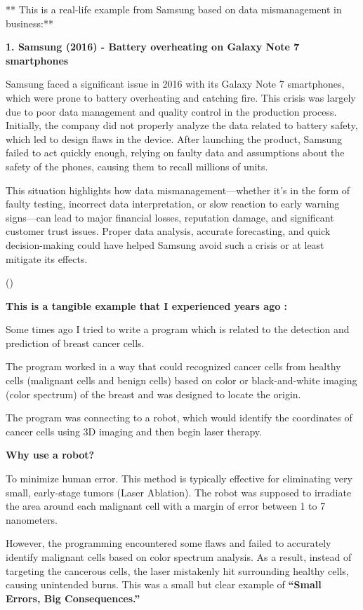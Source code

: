 \documentclass[
  man,
  floatsintext,
  longtable,
  nolmodern,
  notxfonts,
  notimes,
  colorlinks=true,linkcolor=blue,citecolor=blue,urlcolor=blue]{apa7}
\begin{document}
** This is a real-life example from Samsung based on data mismanagement
in business:**

\textbf{1. Samsung (2016) - Battery overheating on Galaxy Note 7
smartphones}

Samsung faced a significant issue in 2016 with its Galaxy Note 7
smartphones, which were prone to battery overheating and catching fire.
This crisis was largely due to poor data management and quality control
in the production process. Initially, the company did not properly
analyze the data related to battery safety, which led to design flaws in
the device. After launching the product, Samsung failed to act quickly
enough, relying on faulty data and assumptions about the safety of the
phones, causing them to recall millions of units.

This situation highlights how data mismanagement---whether it's in the
form of faulty testing, incorrect data interpretation, or slow reaction
to early warning signs---can lead to major financial losses, reputation
damage, and significant customer trust issues. Proper data analysis,
accurate forecasting, and quick decision-making could have helped
Samsung avoid such a crisis or at least mitigate its effects.

()

\textbf{This is a tangible example that I experienced years ago :}

Some times ago I tried to write a program which is related to the
detection and prediction of breast cancer cells.

The program worked in a way that could recognized cancer cells from
healthy cells (malignant cells and benign cells) based on color or
black-and-white imaging (color spectrum) of the breast and was designed
to locate the origin.

The program was connecting to a robot, which would identify the
coordinates of cancer cells using 3D imaging and then begin laser
therapy.

\textbf{Why use a robot?}

To minimize human error. This method is typically effective for
eliminating very small, early-stage tumors (Laser Ablation). The robot
was supposed to irradiate the area around each malignant cell with a
margin of error between 1 to 7 nanometers.

However, the programming encountered some flaws and failed to accurately
identify malignant cells based on color spectrum analysis. As a result,
instead of targeting the cancerous cells, the laser mistakenly hit
surrounding healthy cells, causing unintended burns. This was a small
but clear example of \textbf{``Small Errors, Big Consequences.''}
\end{document}
